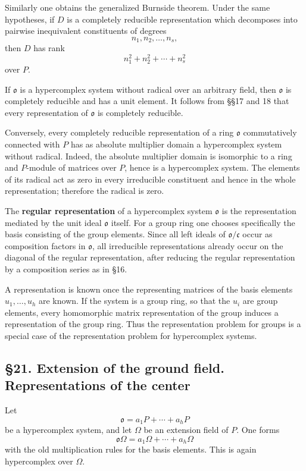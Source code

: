 \documentclass[
  11pt,
]{article}
\begin{document}
Similarly one obtains the generalized Burnside theorem. Under the same
hypotheses, if \(D\) is a completely reducible representation which
decomposes into pairwise inequivalent constituents of degrees \[
  n_1,n_2,\ldots,n_s,
\] then \(D\) has rank \[
  n_1^2+n_2^2+\cdots+n_s^2
\] over \(P\).

If \(\mathfrak{o}\) is a hypercomplex system without radical over an
arbitrary field, then \(\mathfrak{o}\) is completely reducible and has a
unit element. It follows from §§17 and 18 that every representation of
\(\mathfrak{o}\) is completely reducible.

Conversely, every completely reducible representation of a ring
\(\mathfrak{o}\) commutatively connected with \(P\) has as absolute
multiplier domain a hypercomplex system without radical. Indeed, the
absolute multiplier domain is isomorphic to a ring and \(P\)-module of
matrices over \(P\), hence is a hypercomplex system. The elements of its
radical act as zero in every irreducible constituent and hence in the
whole representation; therefore the radical is zero.

The \textbf{regular representation} of a hypercomplex system
\(\mathfrak{o}\) is the representation mediated by the unit ideal
\(\mathfrak{o}\) itself. For a group ring one chooses specifically the
basis consisting of the group elements. Since all left ideals of
\(\mathfrak{o}/\mathfrak c\) occur as composition factors in
\(\mathfrak{o}\), all irreducible representations already occur on the
diagonal of the regular representation, after reducing the regular
representation by a composition series as in §16.

A representation is known once the representing matrices of the basis
elements \(u_1,\ldots,u_h\) are known. If the system is a group ring, so
that the \(u_i\) are group elements, every homomorphic matrix
representation of the group induces a representation of the group ring.
Thus the representation problem for groups is a special case of the
representation problem for hypercomplex systems.

\subsection{§21. Extension of the ground field. Representations of the
center}\label{extension-of-the-ground-field.-representations-of-the-center}

Let \[
  \mathfrak{o}=a_1P+\cdots+a_hP
\] be a hypercomplex system, and let \(\Omega\) be an extension field of
\(P\). One forms \[
  \mathfrak{o}\Omega=a_1\Omega+\cdots+a_h\Omega
\] with the old multiplication rules for the basis elements. This is
again hypercomplex over \(\Omega\).
\end{document}
